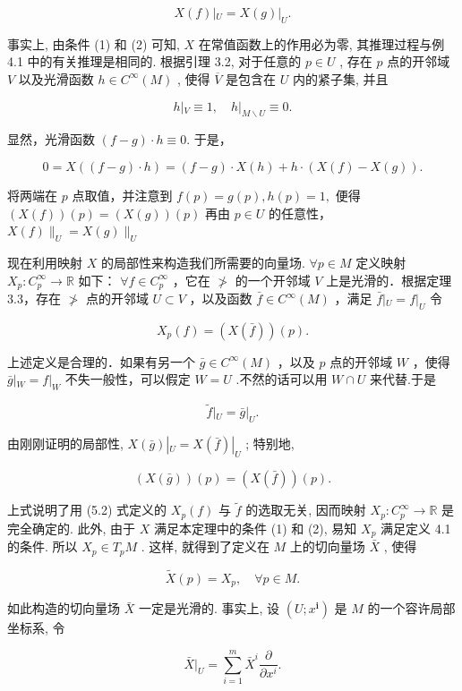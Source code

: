 $$
X (f) | _ {U} = X (g) | _ {U}.
$$

事实上, 由条件 (1) 和 (2) 可知,  $X$  在常值函数上的作用必为零, 其推理过程与例 4.1 中的有关推理是相同的. 根据引理 3.2, 对于任意的  $p \in U$ , 存在  $p$  点的开邻域  $V$  以及光滑函数  $h \in C^{\infty}(M)$ , 使得  $\overline{V}$  是包含在  $U$  内的紧子集, 并且

$$
h | _ {V} \equiv 1, \quad h | _ {M \backslash U} \equiv 0.
$$

显然，光滑函数  $(f - g)\cdot h\equiv 0.$  于是，

$$
0 = X ((f - g) \cdot h) = (f - g) \cdot X (h) + h \cdot (X (f) - X (g)).
$$

将两端在  $p$  点取值，并注意到  $f(p) = g(p), h(p) = 1,$  便得  $(X(f))(p) = (X(g))(p)$  再由  $p\in U$  的任意性，  $X(f)\|_{U} = X(g)\|_{U}$

现在利用映射  $X$  的局部性来构造我们所需要的向量场.  $\forall p\in M$  定义映射  $X_{p}:C_{p}^{\infty}\to \mathbb{R}$  如下：  $\forall f\in C_p^\infty$  ，它在  $\ngtr$  的一个开邻域  $V$  上是光滑的．根据定理3.3，存在  $\ngtr$  点的开邻域  $U\subset V$  ，以及函数 $\bar{f}\in C^{\infty}(M)$  ，满足  $\bar{f}|_{U} = f|_{U}$  令

$$
X _ {p} (f) = \left(X (\bar {f})\right) (p). %
$$

上述定义是合理的．如果有另一个  $\bar{g}\in C^{\infty}(M)$  ，以及  $p$  点的开邻域 $W$  ，使得  $\bar{g} |_{W} = f|_{W}$  不失一般性，可以假定  $W = U$  .不然的话可以用 $W\cap U$  来代替.于是

$$
\tilde {f} | _ {U} = \bar {g} | _ {U}.
$$

由刚刚证明的局部性,  $X(\bar{g})|_{U} = X(\bar{f})|_{U}$ ; 特别地,

$$
(X (\bar {g})) (p) = (X (\bar {f})) (p).
$$

上式说明了用 (5.2) 式定义的  $X_{p}(f)$  与  $\tilde{f}$  的选取无关, 因而映射  $X_{p}: C_{p}^{\infty} \to \mathbb{R}$  是完全确定的. 此外, 由于  $X$  满足本定理中的条件 (1) 和 (2), 易知  $X_{p}$  满足定义 4.1 的条件. 所以  $X_{p} \in T_{p}M$ . 这样, 就得到了定义在  $M$  上的切向量场  $\bar{X}$ , 使得

$$
\tilde {X} (p) = X _ {p}, \quad \forall p \in M.
$$

如此构造的切向量场  $\bar{X}$  一定是光滑的. 事实上, 设  $(U; x^{\mathbf{i}})$  是  $M$  的一个容许局部坐标系, 令

$$
\bar {X} | _ {U} = \sum_ {i = 1} ^ {m} \bar {X} ^ {i} \frac {\partial}{\partial x ^ {i}}.
$$

